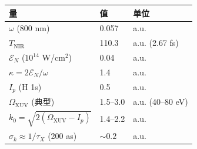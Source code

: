 \documentclass[11pt,a4paper]{ctexart}
\begin{document}
\begin{table}[H]
\centering
\begin{tabular}{p{4cm}p{3cm}p{3cm}}
\toprule
\textbf{量} & \textbf{值} & \textbf{单位} \\
\midrule
$\omega$ (800 nm)  & 0.057   & a.u. \\
$T_{\text{NIR}}$   & 110.3   & a.u. (2.67 fs) \\
$\mathcal{E}_N$ ($10^{14}$ W/cm$^2$) & 0.04 & a.u. \\
$\kappa = 2\mathcal{E}_N/\omega$ & 1.4 & a.u. \\
$I_p$ (H 1s) & 0.5 & a.u. \\
$\Omega_{\text{XUV}}$ (典型) & 1.5--3.0 & a.u. (40--80 eV) \\
$k_0 = \sqrt{2(\Omega_{\text{XUV}}-I_p)}$ & 1.4--2.2 & a.u. \\
$\sigma_k \approx 1/\tau_X$ (200 as) & $\sim 0.2$ & a.u. \\
\bottomrule
\end{tabular}
\end{table}
\end{document}
